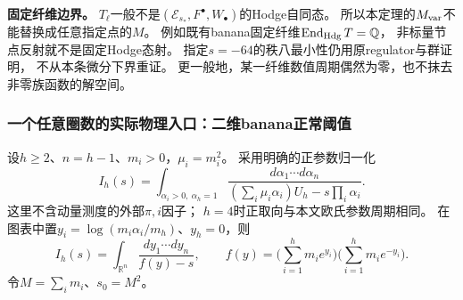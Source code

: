 \documentclass[11pt,a4paper,oneside]{ctexart}
\theoremstyle{cnplain}
\theoremstyle{definition}
\theoremstyle{remark}
\newcommand{\Q}{\mathbb Q}
\numberwithin{equation}{section}
\begin{document}
\textbf{固定纤维边界。}
$T_\ell$一般不是$(\mathcal E_{s_*},F^\bullet,W_\bullet)$的Hodge自同态。
所以本定理的$M_{\rm var}$不能替换成任意指定点的$M$。
例如既有banana固定纤维$\operatorname{End}_{\rm Hdg}T=\Q$，
非标量节点反射就不是固定Hodge态射。
指定$s=-64$的秩八最小性仍用原regulator与群证明，
不从本条微分下界重证。
更一般地，某一纤维数值周期偶然为零，也不抹去非零族函数的解空间。

\subsubsection{一个任意圈数的实际物理入口：二维banana正常阈值}
设$h\ge2$、$n=h-1$、$m_i>0$，$\mu_i=m_i^2$。
采用明确的正参数归一化
\[
 I_h(s)=\int_{\alpha_i>0,\ \alpha_h=1}
 \frac{d\alpha_1\cdots d\alpha_n}
 {(\sum_i\mu_i\alpha_i)U_h-s\prod_i\alpha_i}.
\]
这里不含动量测度的外部$\pi,i$因子；
$h=4$时正取向与本文欧氏参数周期相同。
在图表中置$y_i=\log(m_i\alpha_i/m_h)$、$y_h=0$，则
\[
 I_h(s)=\int_{\mathbb R^n}\frac{dy_1\cdots dy_n}{f(y)-s},
 \qquad
 f(y)=\Big(\sum_{i=1}^h m_i e^{y_i}\Big)
       \Big(\sum_{i=1}^h m_i e^{-y_i}\Big).
\]
令$M=\sum_i m_i$、$s_0=M^2$。
\end{document}
